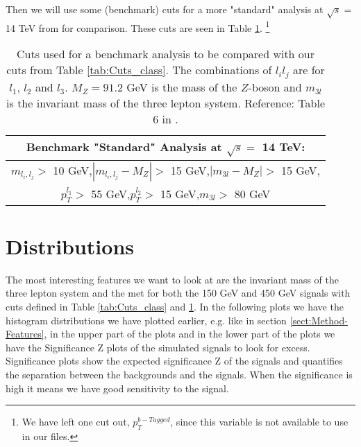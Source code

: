 \documentclass[a4paper, american, 12pt]{report}
\begin{document}
	Then we will use some (benchmark) cuts for a more "standard" analysis at $\sqrt{s} =$ 14 TeV from \citet{inverseseesaw} for comparison. These cuts are seen in Table \ref{tab:Cuts_Benchmark}. \footnote{We have left one cut out, $p_T^{b-Tagged}$, since this variable is not available to use in our files.}
	\begin{table}[ht!]
		\centering
		\begin{tabular}{|c|}
			\hline \rule{0pt}{13pt}
			\textbf{Benchmark "Standard" Analysis at $\sqrt{s}=$ 14 TeV:}\\
			\hline \rule{0pt}{13pt}
			$m_{l_i,l_j}>$ 10 GeV,\quad $|m_{l_i,l_j}-M_Z|>$ 15 GeV,\quad $|m_{3l}-M_Z|>$ 15 GeV,\\
			$p_T^{l_1}>$ 55 GeV,\quad $p_T^{l_2}>$ 15 GeV,\quad $m_{3l}>$ 80 GeV\\
			\hline
		\end{tabular}
		\caption[Benchmark analysis cuts.]{Cuts used for a benchmark analysis to be compared with our cuts from Table \ref{tab:Cuts_class}. The combinations of $l_il_j$ are for $l_1$, $l_2$ and $l_3$. $M_Z=91.2$ GeV is the mass of the $Z$-boson and $m_{3l}$ is the invariant mass of the three lepton system. Reference: Table 6 in \citet{inverseseesaw}.}
		\label{tab:Cuts_Benchmark}
	\end{table}


	\section{Distributions}
	\label{chap:Result-VarDist}
	The most interesting features we want to look at are the invariant mass of the three lepton system and the \acrshort{met} for both the 150 GeV and 450 GeV signals with cuts defined in Table \ref{tab:Cuts_class} and \ref{tab:Cuts_Benchmark}. In the following plots we have the histogram distributions we have plotted earlier, e.g. like in section \ref{sect:Method-Features}, in the upper part of the plots and in the lower part of the plots we have the Significance Z plots of the simulated signals to look for excess. Significance plots show the expected significance Z of the signals and quantifies the separation between the backgrounds and the signals. When the significance is high it means we have good sensitivity to the signal.
\end{document}
